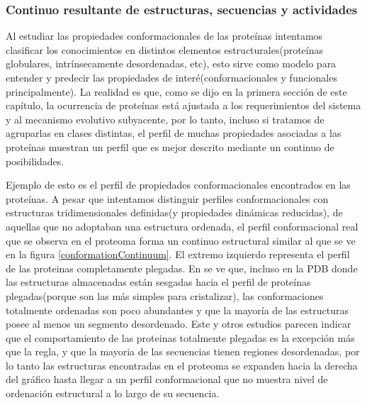 \subsubsection{Continuo resultante de estructuras, secuencias y actividades}

Al estudiar las propiedades conformacionales de las proteínas intentamos clasificar los conocimientos en distintos elementos estructurales(proteínas globulares, intrínsecamente desordenadas, etc), esto sirve como modelo para
entender y predecir las propiedades de interé(conformacionales y funcionales principalmente).
La realidad es que, como se dijo en la primera sección de este capítulo, la ocurrencia de proteínas está ajustada a los requerimientos del sistema y al mecanismo evolutivo subyacente, por lo tanto, 
incluso si tratamos de agruparlas en clases distintas, el perfil de muchas propiedades asociadas a las proteínas muestran un perfil que es mejor descrito mediante un continuo de posibilidades.

Ejemplo de esto es el perfil de propiedades conformacionales encontrados en las proteínas. 
A pesar que intentamos distinguir perfiles conformacionales con estructuras tridimensionales definidas(y propiedades dinámicas reducidas), de aquellas que no adoptaban una estructura ordenada, 
el perfil conformacional real que se observa en el proteoma forma un continuo estructural similar al que se ve en la figura \ref{conformationContinuum}.
El extremo izquierdo representa el perfil de las proteinas completamente plegadas. 
En \cite{gall2007intrinsic} se ve que, incluso en la PDB donde las estructuras almacenadas están sesgadas hacia el perfil de proteínas plegadas(porque son las más simples para cristalizar), las conformaciones totalmente ordenadas son 
poco abundantes y que la mayoría de las estructuras posee al menos un segmento desordenado.
Este y otros estudios parecen indicar que el comportamiento de las proteinas totalmente plegadas es la excepción más que la regla, y que la mayoria de las secuencias tienen regiones desordenadas, por lo tanto las estructuras encontradas 
en el proteoma se expanden hacia la derecha del gráfico hasta llegar a un perfil conformacional que no muestra nivel de ordenación estructural a lo largo de su secuencia.


